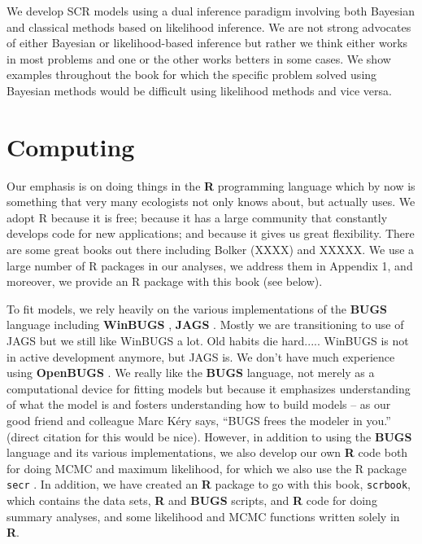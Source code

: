 We develop SCR models using a dual inference paradigm involving both
Bayesian and classical methods based on likelihood inference.
We are not strong advocates of either Bayesian or likelihood-based
inference but rather we think either works in most problems and one or
the other works betters in some cases. 
We show examples throughout the
book for which the specific problem solved using Bayesian methods
would be difficult using likelihood methods and vice versa.



\section*{Computing}

Our emphasis is on doing things in the {\bf R} programming language
which by now is something that very many ecologists not only knows
about, but actually uses. We adopt R because it is free; because it
has a large community that constantly develops code for new
applications; and because it gives us great flexibility.  There are
some great books out there including Bolker (XXXX) and XXXXX. We use a
large number of R packages in our analyses, we address them in
Appendix 1, and moreover, we provide an R package with this book (see
below).


To fit models, we rely heavily on the various implementations of the
{\bf BUGS} language including {\bf WinBUGS} \citep{lunn_etal:2000},
{\bf JAGS} \citep{plummer:2003}. 
 Mostly we are transitioning to use of JAGS but we
still like WinBUGS a lot. Old habits die hard..... WinBUGS is not in
active development anymore, but JAGS is. We don't have much experience
using {\bf OpenBUGS}
 \citep{thomas_etal:2006}. We really like
the {\bf BUGS} language, not merely  as a computational device for
fitting models but because it emphasizes
understanding of what the model is and fosters understanding how to
build models -- as  our good friend and colleague Marc K\'{e}ry says,
``BUGS frees the modeler in you.''  (direct
citation for this would be nice).  However, in addition to using the
{\bf BUGS} language and its various implementations, we also develop our own
{\bf R} code both for doing MCMC
and maximum likelihood, for which we also use the R
package \mbox{\tt secr} \citep{efford:2011}. In addition, we have
created an {\bf R} package to go with this book, \mbox{\tt scrbook},
which contains the data sets, {\bf R} and {\bf BUGS} scripts, and {\bf
  R} code for doing summary analyses, and some likelihood and MCMC
functions written solely in {\bf R}.

